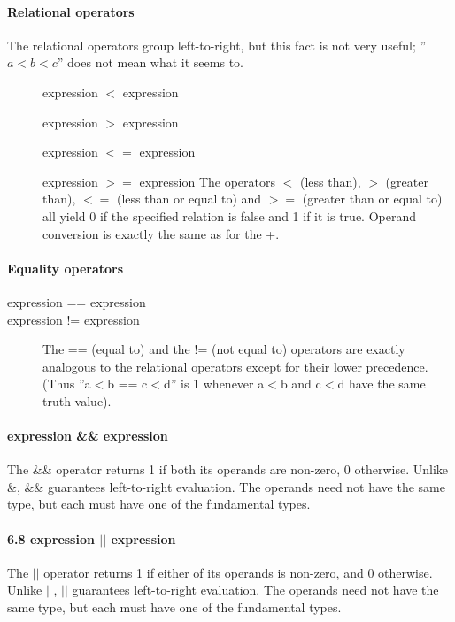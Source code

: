 \documentclass[a4paper]{article}
\begin{document}
\paragraph{Relational operators}
The relational operators group left-to-right, but this fact is not very useful; ''$a<b<c$'' does not mean what it seems to.
\begin{description}
\item[]expression $<$ expression
\item[]expression $>$ expression
\item[]expression $<=$ expression
\item[]expression $>=$ expression
The operators $<$ (less than), $>$ (greater than), $<=$ (less than or equal to) and $>=$ (greater than or equal to) all yield 0 if the specified relation is false and 1 if it is true. Operand conversion is exactly the same as for the +.
\end{description}


\paragraph{Equality operators}
\begin{description}
\item[expression == expression]
\item[expression != expression]
The == (equal to) and the != (not equal to) operators are exactly analogous to the relational operators except for their lower precedence. (Thus ''a$<$b == c$<$d'' is 1 whenever a$<$b and c$<$d have the same truth-value).
\end{description}
\paragraph{expression \&\& expression}
The \&\& operator returns 1 if both its operands are non-zero, 0 otherwise. Unlike \&, \&\& guarantees left-to-right evaluation. The operands need not have the same type, but each must have one of the fundamental types.

\paragraph{6.8 expression $||$ expression}
The $||$ operator returns 1 if either of its operands is non-zero, and 0 otherwise. Unlike $|$ , $||$ guarantees left-to-right evaluation. The operands need not have the same type, but each must have one of the fundamental types.
\end{document}
